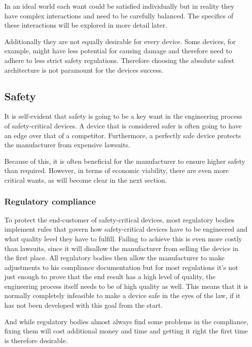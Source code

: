 In an ideal world each want could be satisfied individually but in reality they have complex interactions and need to be carefully balanced. The specifics of these interactions will be explored in more detail later.

Additionally they are not equally desirable for every device. Some devices, for example, might have less potential for causing damage and therefore need to adhere to less strict safety regulations. Therefore choosing the absolute safest architecture is not paramount for the devices success.

\subsection{Safety}
It is self-evident that safety is going to be a key want in the engineering process of safety-critical devices. A device that is considered safer is often going to have an edge over that of a competitor. Furthermore, a perfectly safe device protects the manufacturer from expensive lawsuits.

Because of this, it is often beneficial for the manufacturer to ensure higher safety than required. However, in terms of economic viability, there are even more critical wants, as will become clear in the next section.

\subsubsection{Regulatory compliance}
To protect the end-customer of safety-critical devices, most regulatory bodies implement rules that govern how safety-critical devices have to be engineered and what quality level they have to fulfill.
Failing to achieve this is even more costly than lawsuits, since it will disallow the manufacturer from selling the device in the first place. All regulatory bodies then allow the manufacturer to make adjustments to his compliance documentation but for most regulations it’s not just enough to prove that the end result has a high level of quality, the engineering process itself needs to be of high quality as well. This means that it is normally completely infeasible to make a device safe in the eyes of the law, if it has not been developed with this goal from the start. 

And while regulatory bodies almost always find some problems in the compliance, fixing them will cost additional money and time and getting it right the first time is therefore desirable.

